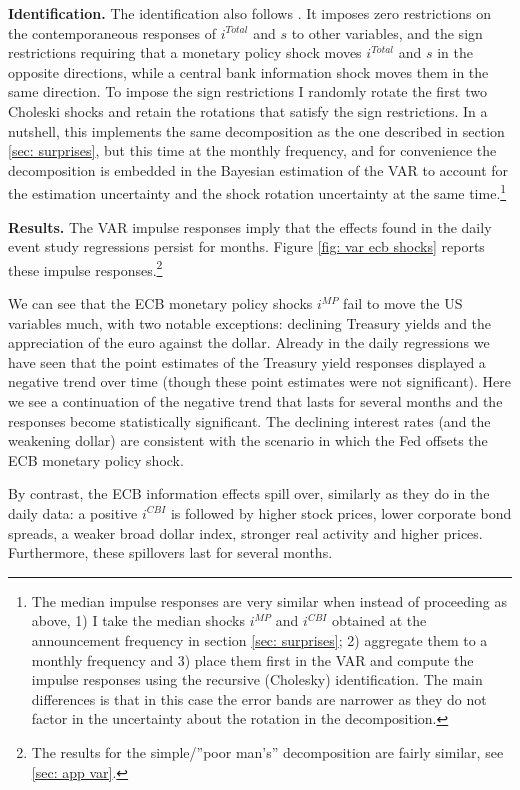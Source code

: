 \documentclass[a4paper,12pt]{article}
\begin{document}
\textbf{Identification.} The identification also follows \cite{Jarocinski_Karadi_2020}. It imposes zero restrictions on the contemporaneous responses of $i^{Total}$ and $s$ to other variables, and the sign restrictions requiring that a monetary policy shock moves $i^{Total}$ and $s$ in the opposite directions, while a central bank information shock moves them in the same direction. To impose the sign restrictions I randomly rotate the first two Choleski shocks and retain the rotations that satisfy the sign restrictions. In a nutshell, this implements the same decomposition as the one described
in section \ref{sec: surprises}, but this time at the monthly frequency, and for convenience the decomposition
is embedded in the Bayesian estimation of the VAR to account for the estimation uncertainty and the shock rotation uncertainty at the same time.\footnote{The median impulse responses are very similar when instead of proceeding as above, 1) I take the median shocks $i^{MP}$ and $i^{CBI}$ obtained at the announcement frequency in section \ref{sec: surprises}; 2) aggregate them to a monthly frequency and 3) place them first in the VAR and compute the impulse responses using the recursive (Cholesky) identification. The main differences is that in this case the error bands are narrower as they do not factor in the uncertainty about the rotation in the decomposition.}

\textbf{Results.} The VAR impulse responses imply that the effects found in the daily event study regressions persist for months. 
Figure \ref{fig: var ecb shocks} reports these impulse responses.\footnote{The results for the simple/''poor man's'' decomposition are fairly similar, see \ref{sec: app var}.}

We can see that the ECB monetary policy shocks $i^{MP}$ fail to move the US variables much,
with two notable exceptions: declining Treasury yields
and the appreciation of the euro against the dollar. 
Already in the daily regressions we have seen that the point estimates of the Treasury yield responses
displayed a negative trend over time (though these point estimates were not significant).
Here we see a continuation of the negative trend that lasts for several months and the responses
become statistically significant.
The declining interest rates (and the weakening dollar) are consistent with the scenario in which
the Fed offsets the ECB monetary policy shock.

By contrast, the ECB information effects spill over, similarly as they do in the daily data:
a positive $i^{CBI}$ is followed by higher stock prices, lower corporate bond spreads, a weaker broad dollar index, stronger real activity and higher prices.
Furthermore, these spillovers last for several months.
\end{document}
